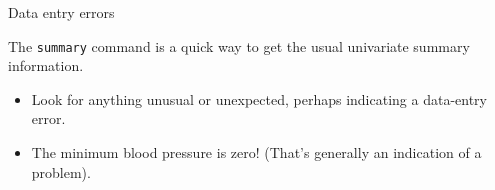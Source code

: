 \begin{frame}[fragile]{Data entry errors}
\protect\hypertarget{data-entry-errors}{}

The \texttt{summary} command is a quick way to get the usual univariate
summary information.

\begin{itemize}
\tightlist
\item
  Look for anything unusual or unexpected, perhaps indicating a
  data-entry error.
\item
  The minimum blood pressure is zero! (That's generally an indication of
  a problem).
\end{itemize}

\begin{Shaded}
\begin{Highlighting}[]
\OperatorTok{$}
\end{Highlighting}
\end{Shaded}


\end{frame}
